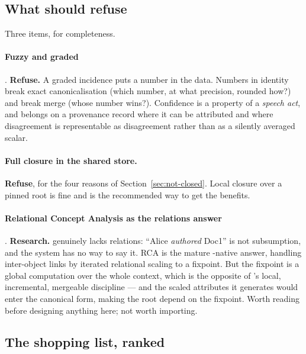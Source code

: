 \subsection{What \odag{} should refuse}

Three items, for completeness.

\paragraph{Fuzzy and graded \fca{}} \citep{belohlavek2004}. \textbf{Refuse.} A
graded incidence puts a number in the data. Numbers in identity break exact
canonicalisation (which number, at what precision, rounded how?) and break
merge (whose number wins?). Confidence is a property of a \emph{speech act},
and belongs on a provenance record where it can be attributed and where
disagreement is representable as disagreement rather than as a silently
averaged scalar.

\paragraph{Full closure in the shared store.} \textbf{Refuse}, for the four
reasons of Section~\ref{sec:not-closed}. Local closure over a pinned root is
fine and is the recommended way to get the benefits.

\paragraph{Relational Concept Analysis as the relations answer}
\citep{rouanehacene2013}. \textbf{Research.} \odag{} genuinely lacks
relations: ``Alice \emph{authored} Doc1'' is not subsumption, and the system
has no way to say it. RCA is the mature \fca{}-native answer, handling
inter-object links by iterated relational scaling to a fixpoint. But the
fixpoint is a global computation over the whole context, which is the opposite
of \odag{}'s local, incremental, mergeable discipline --- and the scaled
attributes it generates would enter the canonical form, making the root depend
on the fixpoint. Worth reading before designing anything here; not worth
importing.

\subsection{The shopping list, ranked}

